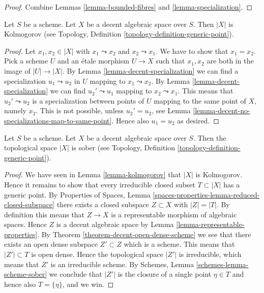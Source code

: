 \begin{proof}
Combine Lemmas \ref{lemma-bounded-fibres} and
\ref{lemma-specialization}.
\end{proof}

\begin{lemma}
\label{lemma-kolmogorov}
Let $S$ be a scheme. Let $X$ be a decent algebraic space over $S$.
Then $|X|$ is Kolmogorov (see
Topology, Definition \ref{topology-definition-generic-point}).
\end{lemma}

\begin{proof}
Let $x_1, x_2 \in |X|$ with $x_1 \leadsto x_2$ and $x_2 \leadsto x_1$.
We have to show that $x_1 = x_2$. Pick a scheme $U$ and an \'etale morphism
$U \to X$ such that $x_1, x_2$ are both in the image of $|U| \to |X|$.
By Lemma \ref{lemma-decent-specialization} we can find a specialization
$u_1 \leadsto u_2$ in $U$ mapping to $x_1 \leadsto x_2$.
By Lemma \ref{lemma-decent-specialization} we can find
$u_2' \leadsto u_1$ mapping to $x_2 \leadsto x_1$. This means that
$u_2' \leadsto u_2$ is a specialization between points of $U$ mapping to
the same point of $X$, namely $x_2$. This is not possible, unless
$u_2' = u_2$, see
Lemma \ref{lemma-decent-no-specializations-map-to-same-point}. Hence
also $u_1 = u_2$ as desired.
\end{proof}

\begin{proposition}
\label{proposition-reasonable-sober}
Let $S$ be a scheme. Let $X$ be a decent algebraic space over $S$.
Then the topological space $|X|$ is sober (see
Topology, Definition \ref{topology-definition-generic-point}).
\end{proposition}

\begin{proof}
We have seen in Lemma \ref{lemma-kolmogorov} that $|X|$ is Kolmogorov.
Hence it remains to show that every irreducible closed subset
$T \subset |X|$ has a generic point. By
Properties of Spaces,
Lemma \ref{spaces-properties-lemma-reduced-closed-subspace}
there exists a closed subspace $Z \subset X$ with $|Z| = |T|$.
By definition this means that $Z \to X$ is a representable morphism
of algebraic spaces. Hence $Z$ is a decent algebraic space
by Lemma \ref{lemma-representable-properties}. By
Theorem \ref{theorem-decent-open-dense-scheme}
we see that there exists an open dense subspace $Z' \subset Z$
which is a scheme. This means that $|Z'| \subset T$ is open dense.
Hence the topological space $|Z'|$ is irreducible, which means that
$Z'$ is an irreducible scheme. By
Schemes, Lemma \ref{schemes-lemma-scheme-sober}
we conclude that $|Z'|$ is the closure of a single point $\eta \in T$
and hence also $T = \overline{\{\eta\}}$, and we win.
\end{proof}

